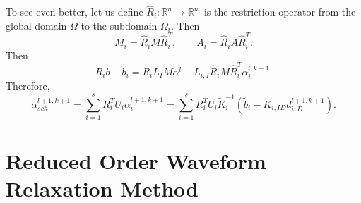 \documentclass[a4paper, 11pt]{article}
\theoremstyle{plain}
\theoremstyle{definition}
\theoremstyle{remark}
\begin{document}
To see even better, let us define $\hat{R}_{i}: \mathbb{R}^{n} \to \mathbb{R}^{n_i}$ is the restriction operator from the global domain $\Omega$ to the subdomain $\Omega_{i}$. Then
\begin{equation*}
    M_{i} = \hat{R}_{i}M\hat{R}_{i}^{T}, \qquad A_{i} = \hat{R}_{i}A\hat{R}_{i}^{T}.
\end{equation*}
Then 
\begin{equation*}
    R_{i}\tilde{b} - \tilde{b}_{i} = R_{i}L_{I}M \alpha^{l} - L_{i, I}\hat{R}_{i}M\hat{R}_{i}^{T} \alpha_{i}^{l, k+1}.
\end{equation*}
Therefore,
\begin{equation*}
    \alpha_{sch}^{l+1, k+1} = \sum_{i = 1}^{s}R_{i}^{T}U_{i}\tilde{\alpha}^{l+1, k + 1}_{i} = \sum_{i = 1}^{s}R_{i}^{T}U_{i}\tilde{K}_{i}^{-1}\left(\tilde{b}_{i} - K_{i, ID}d^{l+1, k+1}_{i, D}\right).
\end{equation*}

\section{Reduced Order Waveform Relaxation Method}
\end{document}
